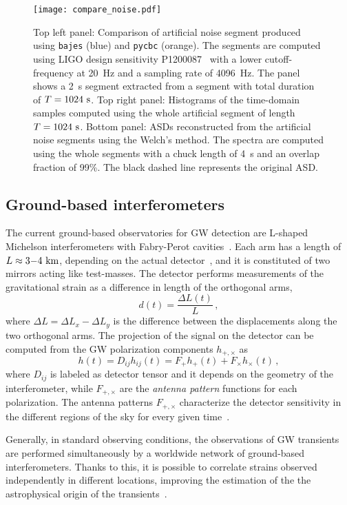 \documentclass[prd,aps,twocolumn,a4paper,showkeys,nofootinbib,floatfix]{revtex4-1}
\newcommand{\be}{\begin{equation}}
\newcommand{\ee}{\end{equation}}
\newcommand{\bajes}{{\tt bajes}}
\begin{document}
\begin{figure}[t]
	\centering 
	\texttt{[image: compare\_noise.pdf]}
	\caption{Top left panel: 
					Comparison of artificial noise segment produced using 
					{\bajes} (blue) 
					and {\tt pycbc} (orange).
					The segments are computed using 
					LIGO design sensitivity P1200087~\cite{Aasi:2013wya}
					with a lower cutoff-frequency at 20~Hz and a sampling rate of 4096~Hz.
					The panel shows a 2~s segment extracted from a
					segment with total duration of $T=1024~{\rm s}$.
					Top right panel: 
					Histograms of the time-domain samples
					computed using the whole artificial segment of length $T=1024~{\rm s}$.
				 	Bottom panel:
				 	ASDs reconstructed 
				 	from the artificial noise segments using the Welch's method.
				 	The spectra are computed using the whole segments
				 	with a chuck length of 4~s and an overlap fraction of 99\%.
				 	The black dashed line represents the original ASD. 
				}
	\label{fig:noise}
\end{figure}

\subsection{Ground-based interferometers} 
\label{sec:det}

The current ground-based observatories for GW detection 
are L-shaped Michelson interferometers
with Fabry-Perot cavities~\cite{Dooley:2014nga, Akutsu:2018axf}. 
Each arm has a length of $L \approx 3{-}4~{\rm km}$,
depending on the actual detector~\cite{TheLIGOScientific:2014jea,TheVirgo:2014hva},
and it is constituted of two mirrors acting like test-masses.
The detector performs measurements of the gravitational strain as a difference in length of the orthogonal arms,
\be
\label{eq:dL_L}
d(t) = \frac{\Delta L(t)}{L} \,,
\ee
where $\Delta L = \Delta L_x - \Delta L_y$ is the difference between the displacements 
along the two orthogonal arms.
The projection of the signal on the detector 
can be computed from the GW polarization components $h_{+,\times}$ as 
\be
\label{eq:pol}
h(t) = D_{ij} h_{ij}(t) = F_+ h_+(t) + F_\times h_\times(t) \,,
\ee
where $D_{ij}$ is labeled as detector tensor and it depends on the geometry of the interferometer,
while $F_{+,\times}$ are the {\it antenna pattern} functions for each polarization.
The antenna patterns $F_{+,\times}$
characterize the detector sensitivity in the different regions of the sky for every given time~\cite{Raymond:2014uha}. 

Generally, in standard observing conditions, 
the observations of GW transients are performed simultaneously by
a worldwide network of ground-based interferometers.
Thanks to this, 
it is possible to correlate strains observed independently 
in different locations,
improving the estimation of the 
the astrophysical origin of the transients~\cite{Nitz:2018imz,Pankow:2018phc}.
\end{document}
